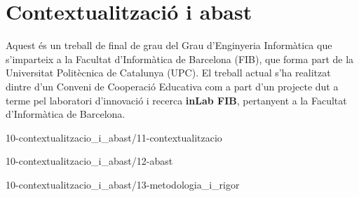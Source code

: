 \chapter{Contextualització i abast}

Aquest és un treball de final de grau del Grau d'Enginyeria Informàtica que s'imparteix a la Facultat d'Informàtica de Barcelona (FIB), que forma part de la Universitat Politècnica de Catalunya (UPC). El treball actual s'ha realitzat dintre d'un Conveni de Cooperació Educativa com a part d'un projecte dut a terme pel laboratori d'innovació i recerca \textbf{inLab FIB}, pertanyent a la Facultat d'Informàtica de Barcelona.

{10-contextualitzacio_i_abast/11-contextualitzacio}

{10-contextualitzacio_i_abast/12-abast}

{10-contextualitzacio_i_abast/13-metodologia_i_rigor}